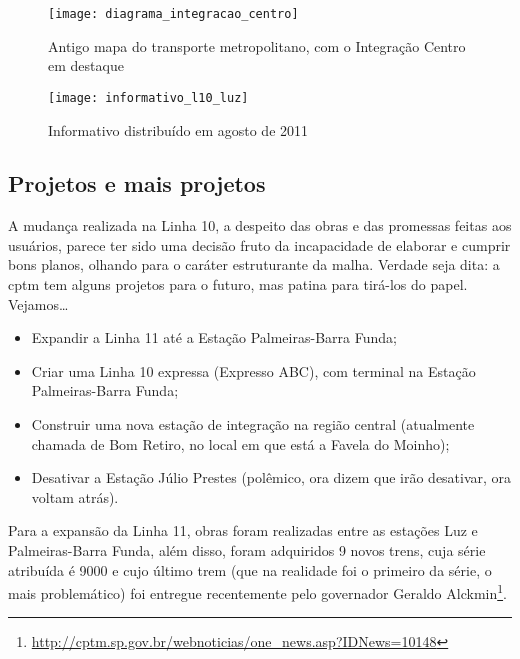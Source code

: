 \documentclass[11pt,fleqn]{book} %
\begin{document}
\begin{landscape}
	\begin{figure}[h]
		\centering
		\caption[Mapa do Integração Centro]{Antigo mapa do transporte metropolitano, com o Integração Centro em destaque}
		\texttt{[image: diagrama\_integracao\_centro]}
		\label{fig:diag_ic}
	\end{figure}
\end{landscape}


\begin{figure}[tp]
	\caption[Informativo agosto/2011]{Informativo distribuído em agosto de 2011}
	\centering
	\texttt{[image: informativo\_l10\_luz]}
	\label{fig:l10_luz}
\end{figure}

\subsection{Projetos e mais projetos}

A mudança realizada na Linha 10, a despeito das obras e das promessas feitas aos usuários, parece ter sido uma decisão fruto da incapacidade de elaborar e cumprir bons planos, olhando para o caráter estruturante da malha. Verdade seja dita: a \gls{cptm} tem alguns projetos para o futuro, mas patina para tirá-los do papel. Vejamos\dots

\begin{itemize}
	\item Expandir a Linha 11 até a Estação Palmeiras-Barra Funda;
	\item Criar uma Linha 10 expressa (Expresso ABC), com terminal na Estação Palmeiras-Barra Funda;
	\item Construir uma nova estação de integração na região central (atualmente chamada de Bom Retiro, no local em que está a Favela do Moinho);
	\item Desativar a Estação Júlio Prestes (polêmico, ora dizem que irão desativar, ora voltam atrás).
\end{itemize}


Para a expansão da Linha 11, obras foram realizadas entre as estações Luz e Palmeiras-Barra Funda, além disso, foram adquiridos 9 novos trens, cuja série atribuída é 9000 e cujo último trem (que na realidade foi o primeiro da série, o mais problemático) foi entregue recentemente pelo governador Geraldo Alckmin\footnote{\url{http://cptm.sp.gov.br/webnoticias/one_news.asp?IDNews=10148}}.
\end{document}
